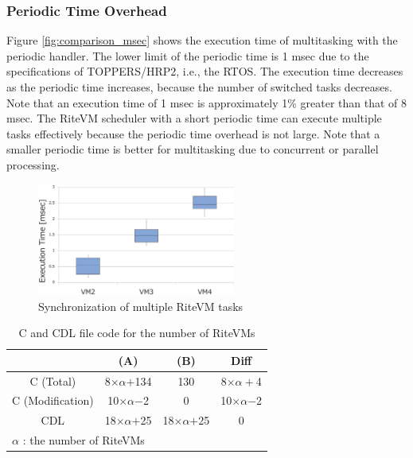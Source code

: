 \documentclass[S,R,E]{article/compsoft}
\begin{document}
\subsubsection{Periodic Time Overhead}
Figure \ref{fig:comparison_msec} shows the execution time of multitasking with the periodic handler.
The lower limit of the periodic time is 1 msec due to the specifications of TOPPERS/HRP2, i.e., the RTOS.
The execution time decreases as the periodic time increases, because the number of switched tasks decreases.
Note that an execution time of 1 msec is approximately 1\% greater than that of 8 msec.
The RiteVM scheduler with a short periodic time can execute multiple tasks effectively because the periodic time overhead is not large.
Note that a smaller periodic time is better for multitasking due to concurrent or parallel processing.

 \begin{figure}[t]
    \centering
    \includegraphics[width=6.5cm,clip]{figure/eval_synchronization.eps}
\caption{Synchronization of multiple RiteVM tasks}
\label{fig:eval_synchronization}
\end{figure}

\begin{table}[t]
    \centering
    \caption{C and CDL file code for the number of RiteVMs}
    \footnotesize
    {\tabcolsep=0.1cm
    \begin{tabular}{c||c|c|c}
                       & (A)       & (B)     & Diff  \\ \hline
        C (Total)          & 8$\times$$\alpha$$+$134  & 130     & 8$\times$$\alpha+$4\\
        C (Modification)   & 10$\times\alpha$$-$2 & 0   &  10$\times\alpha$$-$2 \\
        CDL    & 18$\times$$\alpha$$+$25   & 18$\times$$\alpha$$+$25 & 0     \\
        \multicolumn{3}{l}{ $\alpha$ : the number of RiteVMs}
    \end{tabular}
    }
    \label{tab:codesize}
\end{table}
\end{document}
